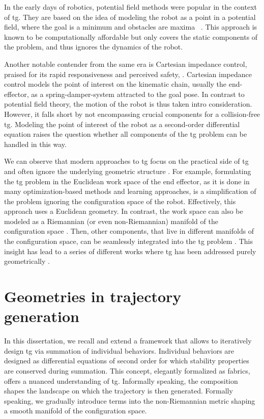 In the early days of robotics, potential field methods were
popular in the context of \ac{tg}.
They are based on the idea of modeling the robot as
a point in a potential field, where the goal is a minimum
and obstacles are maxima
~\cite{barraquand1992numerical,hwang1992potential}. This
approach is known to be computationally affordable but
only covers the static components of the problem, and thus
ignores the dynamics of the robot.

Another notable contender from the same era is Cartesian
impedance control, praised for its rapid responsiveness and
perceived safety, \cite{hogan1985impedance}. Cartesian
impedance control models the point of interest on the
kinematic chain, usually the end-effector, as a
spring-damper-system attracted to the goal pose. In contrast
to potential field theory, the motion of the robot is thus
taken intro consideration. However, it falls short by not
encompassing crucial components for a collision-free
\ac{tg}. Modeling the point of interest of the robot as a
second-order differential equation raises the question
whether all components of the \ac{tg} problem can be handled
in this way. 

We can observe that modern approaches to \ac{tg} focus on
the practical side of \ac{tg} and often ignore the
underlying geometric structure \cite{Ratliff2015}. For
example, formulating the \ac{tg} problem in the Euclidean
work space of the end effector, as it is done in many
optimization-based methods and learning approaches, is a
simplification of the problem ignoring the configuration
space of the robot. Effectively, this approach uses a
Euclidean geometry. In contrast, the work space can also be
modeled as a Riemannian (or even non-Riemannian) manifold of
the configuration space \cite{klein2023design}. Then, other
components, that live in different manifolds of the
configuration space, can be seamlessly integrated into the
\ac{tg} problem \cite{Ratliff2015}. This insight has lead to
a series of different works where \ac{tg} has been addressed
purely geometrically
\cite{Ratliff2015,Cheng2019,Cheng2020,Ratliff2020,Xie2020}.

\section{Geometries in trajectory generation}
\label{sec:geometries_in_trajectory_generation}

In this dissertation, we recall and extend a framework
that allows to iteratively design \ac{tg} via
summation of individual behaviors. Individual behaviors are
designed as differential equations of second order for which
stability properties are conserved during summation.
This concept, elegantly formalized as \ac{fabrics}, offers
a nuanced understanding of \ac{tg}.
Informally speaking, the composition shapes the
landscape on which the trajectory is then generated.
Formally speaking, we gradually introduce terms into the
non-Riemannian metric shaping a smooth manifold of the
configuration space.



